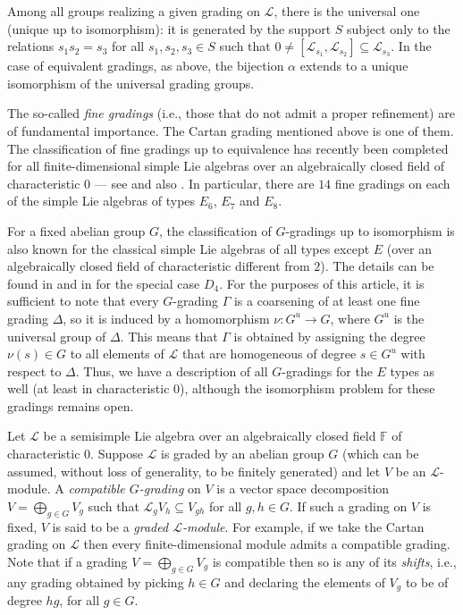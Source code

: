 \documentclass[a4paper,reqno]{amsart}
\theoremstyle{definition}
\numberwithin{theorem}{section}
\numberwithin{equation}{section}
\begin{document}
Among all groups realizing a given grading on ${\mathcal{L}}$, there is the universal one (unique up to isomorphism): it is generated by the support $S$ subject only to the relations $s_1s_2=s_3$ for all $s_1,s_2,s_3\in S$ such that $0\ne[{\mathcal{L}}_{s_1},{\mathcal{L}}_{s_2}]\subseteq{\mathcal{L}}_{s_3}$. In the case of equivalent gradings, as above, the bijection $\alpha$ extends to a unique isomorphism of the universal grading groups.

The so-called \emph{fine gradings} (i.e., those that do not admit a proper refinement) are of fundamental importance. The Cartan grading mentioned above is one of them. The classification of fine gradings up to equivalence has recently been completed for all finite-dimensional simple Lie algebras over an algebraically closed field of characteristic $0$  --- see \cite[Chapters 3--6]{EK_mon} and also \cite{Yu_E,E_char0,DE_over}. In particular, there are $14$ fine gradings on each of the simple Lie algebras of types $E_6$, $E_7$ and $E_8$.

For a fixed abelian group $G$, the classification of $G$-gradings up to isomorphism is also known for the classical simple Lie algebras of all types except $E$ (over an algebraically closed field of characteristic different from $2$). The details can be found in \cite{EK_mon} and in \cite{EK_D4} for the special case $D_4$. For the purposes of this article, it is sufficient to note that every $G$-grading $\Gamma$ is a coarsening of at least one fine grading $\Delta$, so it is induced by a homomorphism $\nu:G^u\to G$, where $G^u$ is the universal group of $\Delta$. This means that $\Gamma$ is obtained by assigning the degree $\nu(s)\in G$ to all elements of ${\mathcal{L}}$ that are homogeneous of degree $s\in G^u$ with respect to $\Delta$. Thus, we have a description of all $G$-gradings for the $E$ types as well (at least in characteristic $0$), although the isomorphism problem for these gradings remains open.

Let ${\mathcal{L}}$ be a semisimple Lie algebra over an algebraically closed field ${\mathbb{F}}$ of characteristic $0$. Suppose ${\mathcal{L}}$ is graded by an abelian group $G$ (which can be assumed, without loss of generality, to be finitely generated) and let $V$ be an ${\mathcal{L}}$-module. A \emph{compatible $G$-grading} on $V$ is a vector space decomposition $V=\bigoplus_{g\in G} V_g$ such that ${\mathcal{L}}_g V_h\subseteq V_{gh}$ for all $g,h\in G$. If such a grading on $V$ is fixed, $V$ is said to be a \emph{graded ${\mathcal{L}}$-module}. For example, if we take the Cartan grading on ${\mathcal{L}}$ then every finite-dimensional module admits a compatible grading. Note that if a grading $V=\bigoplus_{g\in G} V_g$ is compatible then so is any of its \emph{shifts}, i.e., any grading obtained by picking $h\in G$ and declaring the elements of $V_g$ to be of degree $hg$, for all $g\in G$. 
\end{document}
